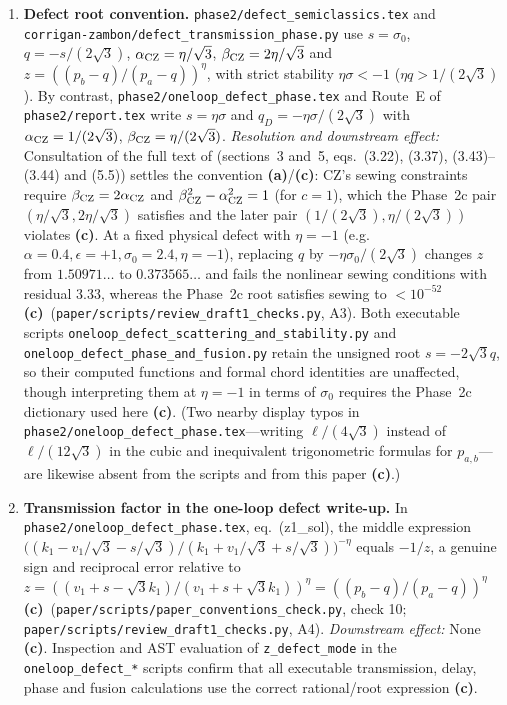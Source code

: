 \documentclass[11pt,a4paper]{article}
\newcommand{\lab}[1]{{\normalfont\sffamily\footnotesize\bfseries(#1)}}
\newcommand{\La}{\lab{a}}
\newcommand{\Lc}{\lab{c}}
\newcommand{\scr}[1]{\nolinkurl{#1}}
\theoremstyle{remark}
\begin{document}
\begin{enumerate}
\item \textbf{Defect root convention.} \scr{phase2/defect_semiclassics.tex} and \scr{corrigan-zambon/defect_transmission_phase.py} use $s=\sigma_0$, $q=-s/(2\sqrt3)$, $\alpha_{\rm CZ}=\eta/\sqrt3$, $\beta_{\rm CZ}=2\eta/\sqrt3$ and $z=((p_b-q)/(p_a-q))^\eta$, with strict stability $\eta\sigma<-1$ ($\eta q>1/(2\sqrt3)$). By contrast, \scr{phase2/oneloop_defect_phase.tex} and Route~E of \scr{phase2/report.tex} write $s=\eta\sigma$ and $q_D=-\eta\sigma/(2\sqrt3)$ with $\alpha_{\rm CZ}=1/(2\sqrt3)$, $\beta_{\rm CZ}=\eta/(2\sqrt3)$. \emph{Resolution and downstream effect:} Consultation of the full text of \cite{CZ} (sections~3 and~5, eqs.~(3.22), (3.37), (3.43)--(3.44) and (5.5)) settles the convention \La/\Lc: CZ's sewing constraints require $\beta_{\rm CZ}=2\alpha_{\rm CZ}$ and $\beta_{\rm CZ}^2-\alpha_{\rm CZ}^2=1$ (for $c=1$), which the Phase~2c pair $(\eta/\sqrt3,2\eta/\sqrt3)$ satisfies and the later pair $(1/(2\sqrt3),\eta/(2\sqrt3))$ violates \Lc. At a fixed physical defect with $\eta=-1$ (e.g.\ $\alpha=0.4,\epsilon=+1,\sigma_0=2.4,\eta=-1$), replacing $q$ by $-\eta\sigma_0/(2\sqrt3)$ changes $z$ from $1.50971\ldots$ to $0.373565\ldots$ and fails the nonlinear sewing conditions with residual $3.33$, whereas the Phase~2c root satisfies sewing to $<10^{-52}$ \Lc\ (\scr{paper/scripts/review_draft1_checks.py}, A3). Both executable scripts \scr{oneloop_defect_scattering_and_stability.py} and \scr{oneloop_defect_phase_and_fusion.py} retain the unsigned root $s=-2\sqrt3q$, so their computed functions and formal chord identities are unaffected, though interpreting them at $\eta=-1$ in terms of $\sigma_0$ requires the Phase~2c dictionary used here \Lc. (Two nearby display typos in \scr{phase2/oneloop_defect_phase.tex}---writing $\ell/(4\sqrt3)$ instead of $\ell/(12\sqrt3)$ in the cubic and inequivalent trigonometric formulas for $p_{a,b}$---are likewise absent from the scripts and from this paper \Lc.)
\item \textbf{Transmission factor in the one-loop defect write-up.} In \scr{phase2/oneloop_defect_phase.tex}, eq.~(z1\_sol), the middle expression $\big((k_1-v_1/\sqrt3-s/\sqrt3)/(k_1+v_1/\sqrt3+s/\sqrt3)\big)^{-\eta}$ equals $-1/z$, a genuine sign and reciprocal error relative to $z=((v_1+s-\sqrt3k_1)/(v_1+s+\sqrt3k_1))^\eta=((p_b-q)/(p_a-q))^\eta$ \Lc\ (\scr{paper/scripts/paper_conventions_check.py}, check 10; \scr{paper/scripts/review_draft1_checks.py}, A4). \emph{Downstream effect:} None \Lc. Inspection and AST evaluation of \scr{z_defect_mode} in the \scr{oneloop_defect_*} scripts confirm that all executable transmission, delay, phase and fusion calculations use the correct rational/root expression \Lc.

\end{enumerate}
\end{document}
